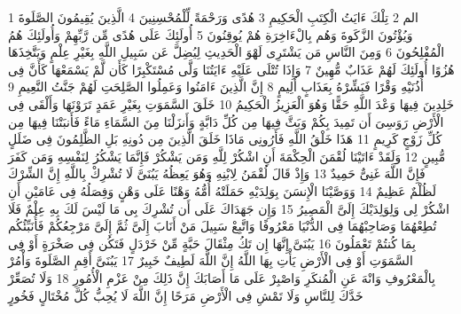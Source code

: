\documentclass[20pt,a4paper]{article}
\title{}
\author{}
\date{}
\begin{document}
\pagecolor{cl_page}



{\tiny\colorbox{cl_aya}{1}} الم
{\tiny\colorbox{cl_aya}{2}} تِلْكَ ءَايَتُ الْكِتَبِ الْحَكِيمِ
{\tiny\colorbox{cl_aya}{3}} هُدًى وَرَحْمَةً لِّلْمُحْسِنِينَ
{\tiny\colorbox{cl_aya}{4}} الَّذِينَ يُقِيمُونَ الصَّلَوةَ وَيُؤْتُونَ الزَّكَوةَ وَهُم بِالْءَاخِرَةِ هُمْ يُوقِنُونَ
{\tiny\colorbox{cl_aya}{5}} أُولَئِكَ عَلَى هُدًى مِّن رَّبِّهِمْ وَأُولَئِكَ هُمُ الْمُفْلِحُونَ
{\tiny\colorbox{cl_aya}{6}} وَمِنَ النَّاسِ مَن يَشْتَرِى لَهْوَ الْحَدِيثِ لِيُضِلَّ عَن سَبِيلِ اللَّهِ بِغَيْرِ عِلْمٍ وَيَتَّخِذَهَا هُزُوًا أُولَئِكَ لَهُمْ عَذَابٌ مُّهِينٌ
{\tiny\colorbox{cl_aya}{7}} وَإِذَا تُتْلَى عَلَيْهِ ءَايَتُنَا وَلَّى مُسْتَكْبِرًا كَأَن لَّمْ يَسْمَعْهَا كَأَنَّ فِى أُذُنَيْهِ وَقْرًا فَبَشِّرْهُ بِعَذَابٍ أَلِيمٍ
{\tiny\colorbox{cl_aya}{8}} إِنَّ الَّذِينَ ءَامَنُوا وَعَمِلُوا الصَّلِحَتِ لَهُمْ جَنَّتُ النَّعِيمِ
{\tiny\colorbox{cl_aya}{9}} خَلِدِينَ فِيهَا وَعْدَ اللَّهِ حَقًّا وَهُوَ الْعَزِيزُ الْحَكِيمُ
{\tiny\colorbox{cl_aya}{10}} خَلَقَ السَّمَوَتِ بِغَيْرِ عَمَدٍ تَرَوْنَهَا وَأَلْقَى فِى الْأَرْضِ رَوَسِىَ أَن تَمِيدَ بِكُمْ وَبَثَّ فِيهَا مِن كُلِّ دَابَّةٍ وَأَنزَلْنَا مِنَ السَّمَاءِ مَاءً فَأَنبَتْنَا فِيهَا مِن كُلِّ زَوْجٍ كَرِيمٍ
{\tiny\colorbox{cl_aya}{11}} هَذَا خَلْقُ اللَّهِ فَأَرُونِى مَاذَا خَلَقَ الَّذِينَ مِن دُونِهِ بَلِ الظَّلِمُونَ فِى ضَلَلٍ مُّبِينٍ
{\tiny\colorbox{cl_aya}{12}} وَلَقَدْ ءَاتَيْنَا لُقْمَنَ الْحِكْمَةَ أَنِ اشْكُرْ لِلَّهِ وَمَن يَشْكُرْ فَإِنَّمَا يَشْكُرُ لِنَفْسِهِ وَمَن كَفَرَ فَإِنَّ اللَّهَ غَنِىٌّ حَمِيدٌ
{\tiny\colorbox{cl_aya}{13}} وَإِذْ قَالَ لُقْمَنُ لِابْنِهِ وَهُوَ يَعِظُهُ يَبُنَىَّ لَا تُشْرِكْ بِاللَّهِ إِنَّ الشِّرْكَ لَظُلْمٌ عَظِيمٌ
{\tiny\colorbox{cl_aya}{14}} وَوَصَّيْنَا الْإِنسَنَ بِوَلِدَيْهِ حَمَلَتْهُ أُمُّهُ وَهْنًا عَلَى وَهْنٍ وَفِصَلُهُ فِى عَامَيْنِ أَنِ اشْكُرْ لِى وَلِوَلِدَيْكَ إِلَىَّ الْمَصِيرُ
{\tiny\colorbox{cl_aya}{15}} وَإِن جَهَدَاكَ عَلَى أَن تُشْرِكَ بِى مَا لَيْسَ لَكَ بِهِ عِلْمٌ فَلَا تُطِعْهُمَا وَصَاحِبْهُمَا فِى الدُّنْيَا مَعْرُوفًا وَاتَّبِعْ سَبِيلَ مَنْ أَنَابَ إِلَىَّ ثُمَّ إِلَىَّ مَرْجِعُكُمْ فَأُنَبِّئُكُم بِمَا كُنتُمْ تَعْمَلُونَ
{\tiny\colorbox{cl_aya}{16}} يَبُنَىَّ إِنَّهَا إِن تَكُ مِثْقَالَ حَبَّةٍ مِّنْ خَرْدَلٍ فَتَكُن فِى صَخْرَةٍ أَوْ فِى السَّمَوَتِ أَوْ فِى الْأَرْضِ يَأْتِ بِهَا اللَّهُ إِنَّ اللَّهَ لَطِيفٌ خَبِيرٌ
{\tiny\colorbox{cl_aya}{17}} يَبُنَىَّ أَقِمِ الصَّلَوةَ وَأْمُرْ بِالْمَعْرُوفِ وَانْهَ عَنِ الْمُنكَرِ وَاصْبِرْ عَلَى مَا أَصَابَكَ إِنَّ ذَلِكَ مِنْ عَزْمِ الْأُمُورِ
{\tiny\colorbox{cl_aya}{18}} وَلَا تُصَعِّرْ خَدَّكَ لِلنَّاسِ وَلَا تَمْشِ فِى الْأَرْضِ مَرَحًا إِنَّ اللَّهَ لَا يُحِبُّ كُلَّ مُخْتَالٍ فَخُورٍ
\end{document}
